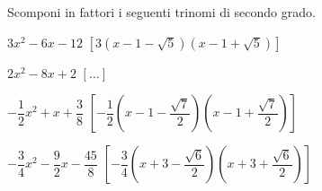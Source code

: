 \begin{esercizio}[\Ast]
 \label{ese:3.87}
Scomponi in fattori i seguenti trinomi di secondo grado.
\begin{enumeratea}
\item$3 x^{2}-6 x-12$ 
 \hfill$\left[3 \left(x-1-\sqrt{5} \right) 
         \left(x-1 + \sqrt{5} \right)\right]$
\item$2 x^{2}-8 x + 2$ 
 \hfill$\left[...\right]$
\item$- \dfrac{1}{2} x^{2} + x + \dfrac{3}{8}$ 
 \hfill$\left[- \dfrac{1}{2} \left(x-1-\dfrac{\sqrt{7}}{2} \right) 
         \left(x- 1 + \dfrac{\sqrt{7}}{2} \right)\right]$
\item$- \dfrac{3}{4} x^{2}-\dfrac{9}{2} x - \dfrac{45}{8}$ 
 \hfill$\left[- \dfrac{3}{4} \left(x + 3-\dfrac{\sqrt{6}}{2} \right) 
         \left(x+ 3 + \dfrac{\sqrt{6}}{2} \right)\right]$
\end{enumeratea}
\end{esercizio}

